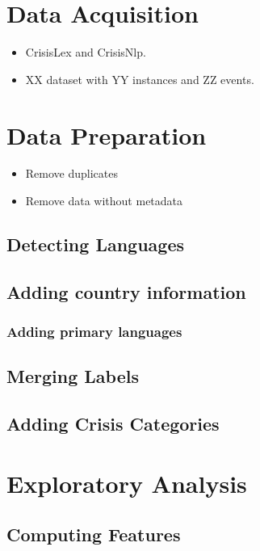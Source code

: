 \documentclass[sigconf]{acmart}
\begin{document}
\section{Data Acquisition}

\begin{itemize}
	\item CrisisLex and CrisisNlp.
	\item XX dataset with YY instances and ZZ events.
\end{itemize}

\section{Data Preparation}

\begin{itemize}
	\item Remove duplicates
	\item Remove data without metadata
\end{itemize}

\subsection{Detecting Languages}

\subsection{Adding country information}

\subsubsection{Adding primary languages}

\subsection{Merging Labels}

\subsection{Adding Crisis Categories}


\section{Exploratory Analysis}

\subsection{Computing Features}
\end{document}
